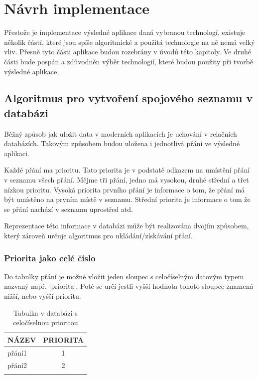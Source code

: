\section{Návrh implementace}
Přestože je implementace výsledné aplikace daná vybranou technologí, existuje několik částí, které jsou spíše algoritmické a použitá technologie na ně nemá velký vliv. Přesně tyto části aplikace budou rozebrány v úvodů této kapitoly.
Ve druhé části bude pospán a zdůvodněn výběr technologií, které budou použity při tvorbě výsledné aplikace.

\subsection{Algoritmus pro vytvoření spojového seznamu v databázi}
Běžný způsob jak uložit data v moderních aplikacích je uchování v relačních databázích. Takovým způsobem budou uložena i jednotlivá přání ve výsledné aplikaci.

Každé přání ma prioritu. Tato priorita je v podstatě odkazem na umístění přání v seznamu všech přání. Mějme tři přání, jedno má vysokou, druhé střední a třet nízkou prioritu. Vysoká priorita prvního přání je informace o tom, že přání má být umístěno na prvním místě v seznamu. Střední priorita je informace o tom že se přání nachází v seznamu uprostřed atd.

Reprezentace této informace v databázi může být realizována dvojím způsobem, který zároveň určuje algoritmus pro ukládání/získávání přání.

\subsubsection{Priorita jako celé číslo}
Do tabulky přání je možné vložit jeden sloupec s celočíselným datovým typem nazvaný např. |priorita|. Poté se určí jestli vyšší hodnota tohoto sloupce znamená nižší, nebo vyšší prioritu.
\begin{table}[htb]
	\begin{center}
	  \begin{tabular}{ | l | c | }
	    \hline
	    NÁZEV & PRIORITA  \\ \hline \hline
	    přání1 & 1  \\ \hline
	    přání2 & 2 \\ \hline
	     &  \\ \hline
	  \end{tabular}
	  \caption{Tabulka v databázi s celočíselnou prioritou}
	  \label{tab:integer-priority}
	\end{center}
\end{table}


